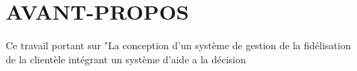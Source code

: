 \chapter*{AVANT-PROPOS}
Ce travail portant sur "La conception d’un système de gestion de
la fidélisation de la clientèle intégrant un système d’aide a la décision 